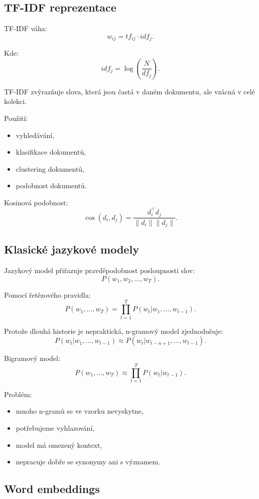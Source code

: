\subsection{TF-IDF reprezentace}

TF-IDF váha:
\[
w_{ij}
=
tf_{ij}\cdot idf_j.
\]

Kde:
\[
idf_j=
\log\left(\frac{N}{df_j}\right).
\]

TF-IDF zvýrazňuje slova, která jsou častá v daném dokumentu, ale vzácná v celé kolekci.

Použití:
\begin{itemize}
    \item vyhledávání,
    \item klasifikace dokumentů,
    \item clustering dokumentů,
    \item podobnost dokumentů.
\end{itemize}

Kosinová podobnost:
\[
\cos(d_i,d_j)
=
\frac{d_i^\top d_j}
{\|d_i\|\|d_j\|}.
\]

\subsection{Klasické jazykové modely}

Jazykový model přiřazuje pravděpodobnost posloupnosti slov:
\[
P(w_1,w_2,\ldots,w_T).
\]

Pomocí řetězového pravidla:
\[
P(w_1,\ldots,w_T)
=
\prod_{t=1}^{T}
P(w_t|w_1,\ldots,w_{t-1}).
\]

Protože dlouhá historie je nepraktická, n-gramový model zjednodušuje:
\[
P(w_t|w_1,\ldots,w_{t-1})
\approx
P(w_t|w_{t-n+1},\ldots,w_{t-1}).
\]

Bigramový model:
\[
P(w_1,\ldots,w_T)
\approx
\prod_{t=1}^{T}
P(w_t|w_{t-1}).
\]

Problém:
\begin{itemize}
    \item mnoho n-gramů se ve vzorku nevyskytne,
    \item potřebujeme vyhlazování,
    \item model má omezený kontext,
    \item nepracuje dobře se synonymy ani s významem.
\end{itemize}

\subsection{Word embeddings}

